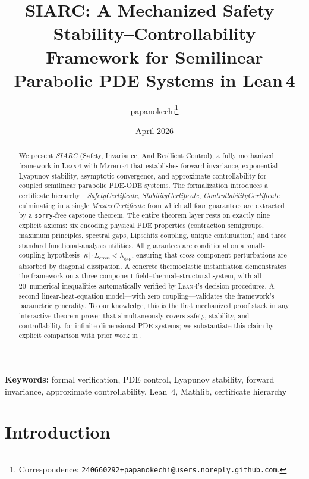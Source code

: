 \documentclass[11pt,a4paper]{article}
\title{%
  SIARC: A Mechanized Safety--Stability--Controllability\\
  Framework for Semilinear Parabolic PDE Systems in Lean\,4%
}
\author{papanokechi\thanks{Correspondence: \texttt{240660292+papanokechi@users.noreply.github.com}.}}
\date{April 2026}
\theoremstyle{plain}
\theoremstyle{definition}
\theoremstyle{remark}
\newcommand{\abs}[1]{\lvert #1 \rvert}
\newcommand{\kk}{\kappa}
\newcommand{\Lean}{\textsc{Lean\,4}}
\newcommand{\Mathlib}{\textsc{Mathlib4}}
\newcommand{\sorry}{\texttt{sorry}}
\begin{document}
\maketitle

\begin{abstract}
We present \emph{SIARC} (Safety, Invariance, And Resilient Control), a
fully mechanized framework in \Lean{} with \Mathlib{} that establishes
forward invariance, exponential Lyapunov stability, asymptotic
convergence, and approximate controllability for coupled semilinear
parabolic PDE-ODE systems.  The formalization introduces a certificate
hierarchy---\emph{SafetyCertificate}, \emph{StabilityCertificate},
\emph{ControllabilityCertificate}---culminating in a single
\emph{MasterCertificate} from which all four guarantees are extracted by
a \sorry{}-free capstone theorem.  The entire theorem layer rests on
exactly nine explicit axioms: six encoding physical PDE properties
(contraction semigroups, maximum principles, spectral gaps, Lipschitz
coupling, unique continuation) and three standard functional-analysis
utilities.  All guarantees are conditional on a small-coupling hypothesis
$\abs{\kk} \cdot L_{\mathrm{cross}} < \lambda_{\mathrm{gap}}$, ensuring
that cross-component perturbations are absorbed by diagonal dissipation.
A concrete thermoelastic instantiation demonstrates the framework on a
three-component field--thermal--structural system, with all 20~numerical
inequalities automatically verified by \Lean{}'s decision procedures.
A second linear-heat-equation model---with zero coupling---validates the
framework's parametric generality.  To our knowledge, this is the first
mechanized proof stack in any interactive theorem prover that
simultaneously covers safety, stability, and controllability for
infinite-dimensional PDE systems; we substantiate this claim by explicit
comparison with prior work in .
\end{abstract}

\medskip
\noindent\textbf{Keywords:}
formal verification, PDE control, Lyapunov stability, forward invariance,
approximate controllability, Lean~4, Mathlib, certificate hierarchy

\section{Introduction}\label{sec:intro}
\end{document}
